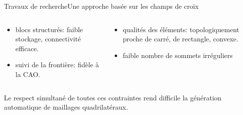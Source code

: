 \documentclass[compress,10pt,aspectratio=169]{beamer}
\begin{document}
\begin{frame}{Travaux de recherche}{Une approche basée sur les champs de croix}
{\begin{columns}
\begin{column}{0.5\textwidth}
\begin{itemize}
\item blocs structurés: {\color{onera_gray}faible stockage, connectivité efficace.}%
\item suivi de la frontière: {\color{onera_gray} fidèle à la CAO.}%
\end{itemize}
\end{column}

\begin{column}{0.5\textwidth}
\begin{itemize}
\item qualités des éléments: {\color{onera_gray} topologiquement proche de carré, de rectangle, convexe.}
\item faible nombre de sommets irréguliers
\end{itemize}
\end{column}
\end{columns}
\vspace{0.35cm}
Le respect simultané de toutes ces contraintes rend difficile la génération automatique de maillages quadrilatéraux.
}
\end{frame}
\end{document}
